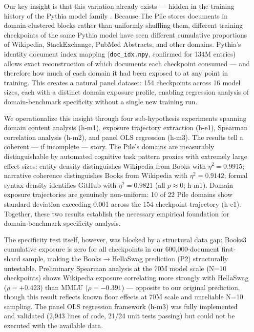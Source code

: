 Our key insight is that this variation already exists --- hidden in the training history of the Pythia model family \cite{Biderman2023Pythia}. Because The Pile stores documents in domain-clustered blocks rather than uniformly shuffling them, different training checkpoints of the same Pythia model have seen different cumulative proportions of Wikipedia, StackExchange, PubMed Abstracts, and other domains. Pythia's identity document index mapping (\texttt{doc\_idx.npy}, confirmed for 134M entries) allows exact reconstruction of which documents each checkpoint consumed --- and therefore how much of each domain it had been exposed to at any point in training. This creates a natural panel dataset: 154 checkpoints across 16 model sizes, each with a distinct domain exposure profile, enabling regression analysis of domain-benchmark specificity without a single new training run.

We operationalize this insight through four sub-hypothesis experiments spanning domain content analysis (h-m1), exposure trajectory extraction (h-e1), Spearman correlation analysis (h-m2), and panel OLS regression (h-m3). The results tell a coherent --- if incomplete --- story. The Pile's domains are measurably distinguishable by automated cognitive task pattern proxies with extremely large effect sizes: entity density distinguishes Wikipedia from Books with $\eta^2 = 0.9915$; narrative coherence distinguishes Books from Wikipedia with $\eta^2 = 0.9142$; formal syntax density identifies GitHub with $\eta^2 = 0.9821$ (all $p \approx 0$; h-m1). Domain exposure trajectories are genuinely non-uniform: 10 of 22 Pile domains show standard deviation exceeding 0.001 across the 154-checkpoint trajectory (h-e1). Together, these two results establish the necessary empirical foundation for domain-benchmark specificity analysis.

The specificity test itself, however, was blocked by a structural data gap: Books3 cumulative exposure is zero for all checkpoints in our 600,000-document first-shard sample, making the Books$\to$HellaSwag prediction (P2) structurally untestable. Preliminary Spearman analysis at the 70M model scale (N=10 checkpoints) shows Wikipedia exposure correlating more strongly with HellaSwag ($\rho = +0.423$) than MMLU ($\rho = -0.391$) --- opposite to our original prediction, though this result reflects known floor effects at 70M scale and unreliable N=10 sampling. The panel OLS regression framework (h-m3) was fully implemented and validated (2,943 lines of code, 21/24 unit tests passing) but could not be executed with the available data.

